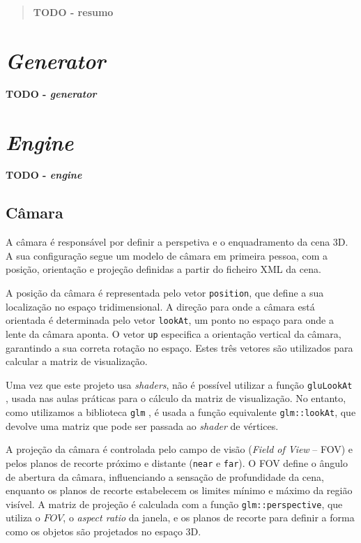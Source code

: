 \documentclass[12pt, a4paper]{article}
\begin{document}
\pagebreak

\begin{abstract}
    \textbf{\color{red} TODO - resumo}
\end{abstract}

\section{\emph{Generator}}

\textbf{\color{red} TODO - \emph{generator}}

\section{\emph{Engine}}

\textbf{\color{red} TODO - \emph{engine}}

\subsection{Câmara}

A câmara é responsável por definir a perspetiva e o enquadramento da cena 3D. A sua configuração
segue um modelo de câmara em primeira pessoa, com a posição, orientação e projeção definidas a
partir do ficheiro XML da cena.

A posição da câmara é representada pelo vetor \texttt{position}, que define a sua localização no
espaço tridimensional. A direção para onde a câmara está orientada é determinada pelo vetor
\texttt{lookAt}, um ponto no espaço para onde a lente da câmara aponta. O vetor \texttt{up}
especifica a orientação vertical da câmara, garantindo a sua correta rotação no espaço. Estes três
vetores são utilizados para calcular a matriz de visualização.

Uma vez que este projeto usa \emph{shaders}, não é possível utilizar a função \texttt{gluLookAt}
\cite{gluLookAt}, usada nas aulas práticas para o cálculo da matriz de visualização. No entanto,
como utilizamos a biblioteca \texttt{glm} \cite{glm}, é usada a função equivalente
\texttt{glm::lookAt}, que devolve uma matriz que pode ser passada ao \emph{shader} de vértices.

A projeção da câmara é controlada pelo campo de visão (\emph{Field of View} -- FOV) e pelos planos
de recorte próximo e distante (\texttt{near} e \texttt{far}). O FOV define o ângulo de abertura da
câmara, influenciando a sensação de profundidade da cena, enquanto os planos de recorte estabelecem
os limites mínimo e máximo da região visível. A matriz de projeção é calculada com a função
\texttt{glm::perspective}, que utiliza o $FOV$, o \emph{aspect ratio} da janela, e os planos de
recorte para definir a forma como os objetos são projetados no espaço 3D.
\end{document}
